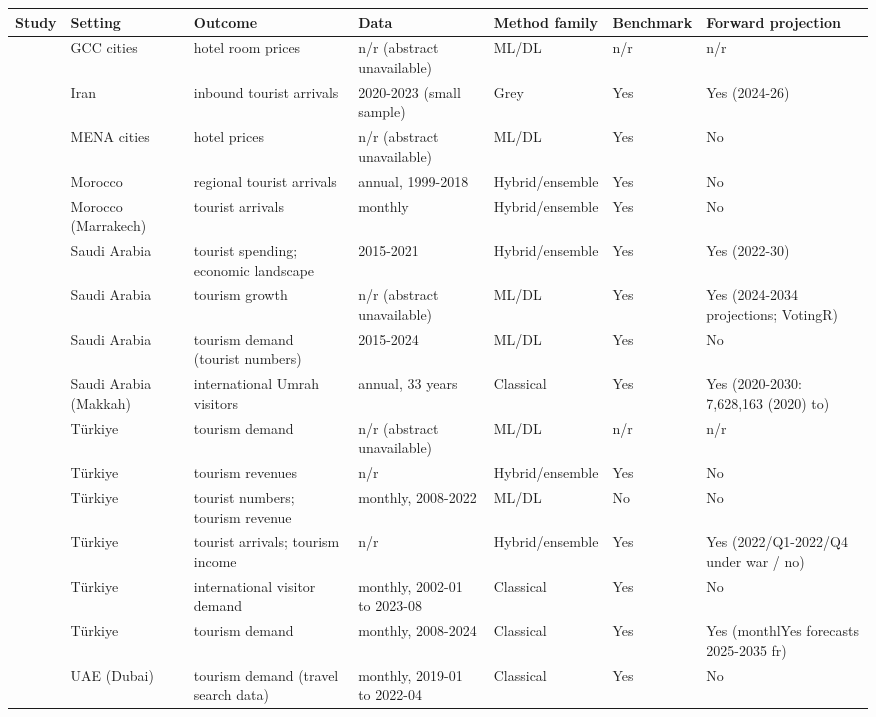 \begin{tabularx}{\linewidth}{@{}p{3.2cm}p{3.0cm}p{4.6cm}p{4.2cm}p{2.6cm}p{1.7cm}p{2.6cm}@{}}
\toprule
Study & Setting & Outcome & Data & Method family & Benchmark & Forward projection\\
\midrule
\citet{AlShehhi2020} & GCC cities & hotel room prices & n/r (abstract unavailable) & ML/DL & n/r & n/r \\
\citet{Ahmadian2026} & Iran & inbound tourist arrivals & 2020-2023 (small sample) & Grey & Yes & Yes (2024-26) \\
\citet{AlShehhi2018} & MENA cities & hotel prices & n/r (abstract unavailable) & ML/DL & Yes & No \\
\citet{Ouassou2022} & Morocco & regional tourist arrivals & annual, 1999-2018 & Hybrid/ensemble & Yes & No \\
\citet{Laaroussi2023} & Morocco (Marrakech) & tourist arrivals & monthly & Hybrid/ensemble & Yes & No \\
\citet{Louati2024} & Saudi Arabia & tourist spending; economic landscape & 2015-2021 & Hybrid/ensemble & Yes & Yes (2022-30) \\
\citet{Alsulami2026} & Saudi Arabia & tourism growth & n/r (abstract unavailable) & ML/DL & Yes & Yes (2024-2034 projections; VotingR) \\
\citet{Zamzami2026} & Saudi Arabia & tourism demand (tourist numbers) & 2015-2024 & ML/DL & Yes & No \\
\citet{Alamoudi2020} & Saudi Arabia (Makkah) & international Umrah visitors & annual, 33 years & Classical & Yes & Yes (2020-2030: 7,628,163 (2020) to) \\
\citet{Cankurt2016} & T\"urkiye & tourism demand & n/r (abstract unavailable) & ML/DL & n/r & n/r \\
\citet{Cuhadar2020} & T\"urkiye & tourism revenues & n/r & Hybrid/ensemble & Yes & No \\
\citet{Tuncsiper2023} & T\"urkiye & tourist numbers; tourism revenue & monthly, 2008-2022 & ML/DL & No & No \\
\citet{Kayral2023} & T\"urkiye & tourist arrivals; tourism income & n/r & Hybrid/ensemble & Yes & Yes (2022/Q1-2022/Q4 under war / no) \\
\citet{Kurtulay2024} & T\"urkiye & international visitor demand & monthly, 2002-01 to 2023-08 & Classical & Yes & No \\
\citet{Bilek2025} & T\"urkiye & tourism demand & monthly, 2008-2024 & Classical & Yes & Yes (monthlYes forecasts 2025-2035 fr) \\
\citet{Rashad2022} & UAE (Dubai) & tourism demand (travel search data) & monthly, 2019-01 to 2022-04 & Classical & Yes & No \\
\bottomrule
\end{tabularx}
